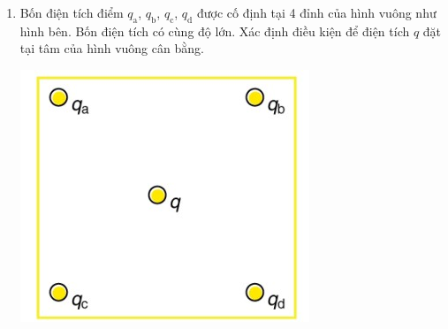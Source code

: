 \begin{enumerate}[label=\bfseries Câu \arabic*:]
\item Bốn điện tích điểm $q_\text{a}$, $q_\text{b}$, $q_\text{c}$, $q_\text{d}$ được cố định tại 4 đỉnh của hình vuông như hình bên. Bốn điện tích có cùng độ lớn. Xác định điều kiện để điện tích $q$ đặt tại tâm của hình vuông cân bằng.
\begin{center}
	\includegraphics[width=0.4\linewidth]{../figs/PH11-MidSem2-01-7}
\end{center}


\end{enumerate}
